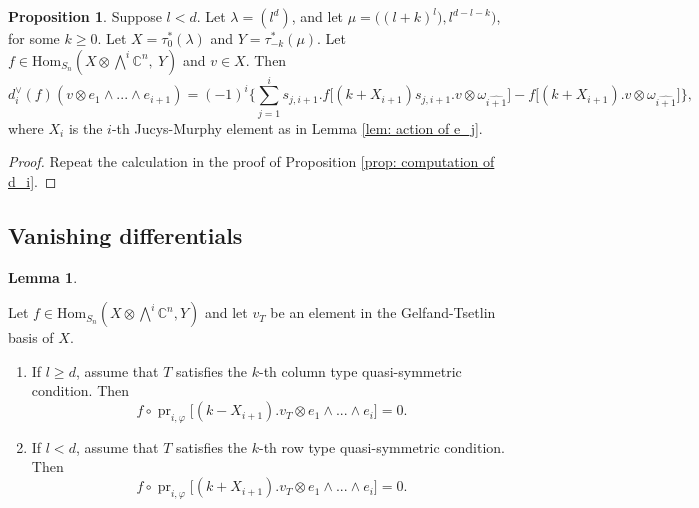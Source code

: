 \documentclass[11pt]{amsart}
\numberwithin{equation}{section}
\theoremstyle{definition}
\newtheorem{lemma}[thm]{Lemma}
\newtheorem{proposition}[thm]{Proposition}
\renewcommand{\phi}{\varphi}
\begin{document}
\begin{proposition}\label{prop: computation of d_i for l<d}
    Suppose $l<d$. Let $\lambda=(l^{d})$, and let $\mu=\big((l+k)^{l}),l^{d-l-k}\big)$,  for some $k\geq0$. Let $X=\tau_{0}^{*}(\lambda)$ and $Y=\tau_{-k}^{*}(\mu)$. Let 
    $f\in\text{Hom}_{S_{n}}(X\otimes\bigwedge^{i}\mathbb{C}^{n},\ Y)$ and $v\in X$. Then
    \begin{equation}\label{d_i(f)2}
    d_{i}^{\vee}(f)(v\otimes e_{1}\wedge...\wedge e_{i+1})=
    (-1)^{i}\Bigg\{\sum_{j=1}^{i} s_{j,i+1}.f\big[(k+X_{i+1})s_{j,i+1}.v\otimes\omega_{\hat{i+1}} \big]-f\big[(k+X_{i+1}).v\otimes\omega_{\hat{i+1}}\big]\Bigg\},
   \end{equation}
   where $X_{i}$ is the $i$-th Jucys-Murphy element as in Lemma \ref{lem: action of e_j}.

\end{proposition}
\begin{proof}
    Repeat the calculation in the proof of Proposition \ref{prop: computation of d_i}.
\end{proof}






\subsection{Vanishing differentials}




\begin{lemma} \label{lem vanishing on gt   basis}

Let $f \in \mathrm{Hom}_{S_n}(X\otimes \bigwedge^i\mathbb C^n, Y)$ and let $v_T$ be an element in the Gelfand-Tsetlin basis of $X$. 
\begin{enumerate}
    \item If $l\geq d$, assume that $T$ satisfies the $k$-th column type quasi-symmetric condition. Then 
    \[   f\circ\operatorname{pr}_{i,\phi}\big[(k-X_{i+1}).v_T \otimes e_{1}\wedge...\wedge e_{i}\big] =0.
    \]
    \item If $l<d$, assume that $T$ satisfies the $k$-th row type quasi-symmetric condition. Then 
    \[   f\circ\operatorname{pr}_{i,\phi}\big[(k+X_{i+1}).v_T \otimes e_{1}\wedge...\wedge e_{i}\big] =0 .
     \]
     \end{enumerate}
\end{lemma}
\end{document}
